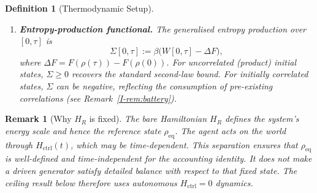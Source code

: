 \documentclass[12pt,a4paper,openany]{book}
\newtheorem{definition}[theorem]{Definition}
\newtheorem{remark}[theorem]{Remark}
\begin{document}
\begin{definition}[Thermodynamic Setup]
\begin{enumerate}
\item \textbf{Entropy-production functional.}
  The \emph{generalised entropy production} over $[0,\tau]$ is
  \begin{equation}
  \label{I-eq:Sigma}
  \Sigma[0,\tau] := \beta\bigl(W[0,\tau] - \Delta F\bigr),
  \end{equation}
  where $\Delta F = F(\rho(\tau)) - F(\rho(0))$.
  For uncorrelated (product) initial states,
  $\Sigma \geq 0$ recovers the standard second-law bound.
  For initially correlated states, $\Sigma$ can be
  \emph{negative}, reflecting the consumption of
  pre-existing correlations
  (see Remark~\ref{I-rem:battery}).
\end{enumerate}
\end{definition}

\begin{remark}[Why $H_R$ is fixed]
\label{I-rem:H_fixed}
The bare Hamiltonian $H_R$ defines the system's energy scale and
hence the reference state $\rho_{\mathrm{eq}}$.
The agent acts on the world through $H_{\mathrm{ctrl}}(t)$,
which may be time-dependent.
This separation ensures that $\rho_{\mathrm{eq}}$ is
well-defined and time-independent for the accounting identity.
It does \emph{not} make a driven generator satisfy detailed balance
with respect to that fixed state.  The ceiling result below therefore
uses autonomous $H_{\mathrm{ctrl}}=0$ dynamics.
\end{remark}
\end{document}
